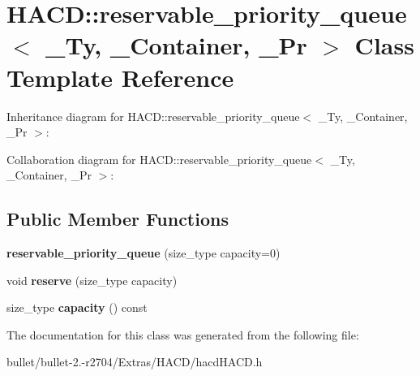 \hypertarget{class_h_a_c_d_1_1reservable__priority__queue}{\section{H\+A\+C\+D\+:\+:reservable\+\_\+priority\+\_\+queue$<$ \+\_\+\+Ty, \+\_\+\+Container, \+\_\+\+Pr $>$ Class Template Reference}
\label{class_h_a_c_d_1_1reservable__priority__queue}
}


Inheritance diagram for H\+A\+C\+D\+:\+:reservable\+\_\+priority\+\_\+queue$<$ \+\_\+\+Ty, \+\_\+\+Container, \+\_\+\+Pr $>$\+:


Collaboration diagram for H\+A\+C\+D\+:\+:reservable\+\_\+priority\+\_\+queue$<$ \+\_\+\+Ty, \+\_\+\+Container, \+\_\+\+Pr $>$\+:
\subsection*{Public Member Functions}
\begin{DoxyCompactItemize}
\item 
\hypertarget{class_h_a_c_d_1_1reservable__priority__queue_a314284045bbef24157be794b9792b9bc}{{\bfseries reservable\+\_\+priority\+\_\+queue} (size\+\_\+type capacity=0)}\label{class_h_a_c_d_1_1reservable__priority__queue_a314284045bbef24157be794b9792b9bc}

\item 
\hypertarget{class_h_a_c_d_1_1reservable__priority__queue_a03e464bec9445f078b4cb706e2663b55}{void {\bfseries reserve} (size\+\_\+type capacity)}\label{class_h_a_c_d_1_1reservable__priority__queue_a03e464bec9445f078b4cb706e2663b55}

\item 
\hypertarget{class_h_a_c_d_1_1reservable__priority__queue_a01459810c05a6164a99213970a56db89}{size\+\_\+type {\bfseries capacity} () const }\label{class_h_a_c_d_1_1reservable__priority__queue_a01459810c05a6164a99213970a56db89}

\end{DoxyCompactItemize}


The documentation for this class was generated from the following file\+:\begin{DoxyCompactItemize}
\item 
bullet/bullet-\/2.-\/r2704/\+Extras/\+H\+A\+C\+D/hacd\+H\+A\+C\+D.\+h\end{DoxyCompactItemize}
